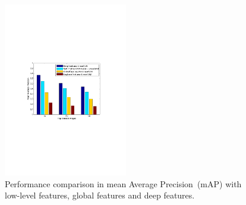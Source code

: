 \documentclass[11pt,twocolumn,twoside]{IEEEtran}
\begin{document}

\begin{figure}[h]
\includegraphics[width=0.48\textwidth]{fig8.pdf}
\centering
\caption{Performance comparison in mean Average Precision~(mAP) with low-level features, global features and deep features.} \label{fig:fig6}
\end{figure}
\end{document}
